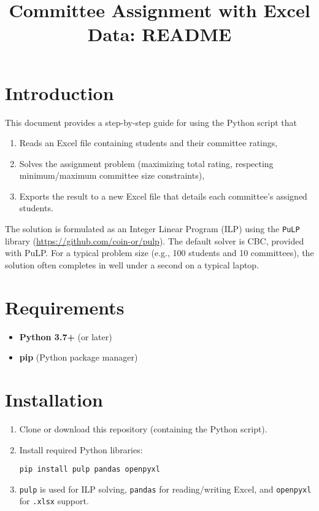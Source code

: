 \documentclass[12pt]{article}
\begin{document}
\title{Committee Assignment with Excel Data: README}
\author{}
\date{}
\maketitle

\section{Introduction}

This document provides a step-by-step guide for using the Python script that
\begin{enumerate}
    \item Reads an Excel file containing students and their committee ratings,
    \item Solves the assignment problem (maximizing total rating, respecting minimum/maximum committee size constraints),
    \item Exports the result to a new Excel file that details each committee's assigned students.
\end{enumerate}

The solution is formulated as an Integer Linear Program (ILP) using the
\texttt{PuLP} library (\url{https://github.com/coin-or/pulp}).
The default solver is CBC, provided with PuLP.
For a typical problem size (e.g., 100 students and 10 committees), the solution
often completes in well under a second on a typical laptop.

\section{Requirements}

\begin{itemize}
    \item \textbf{Python 3.7+} (or later)
    \item \textbf{pip} (Python package manager)
\end{itemize}

\section{Installation}

\begin{enumerate}
    \item Clone or download this repository (containing the Python script).
    \item Install required Python libraries:
          \begin{verbatim}
pip install pulp pandas openpyxl
    \end{verbatim}
    \item \texttt{pulp} is used for ILP solving,
          \texttt{pandas} for reading/writing Excel,
          and \texttt{openpyxl} for \texttt{.xlsx} support.
\end{enumerate}
\end{document}
